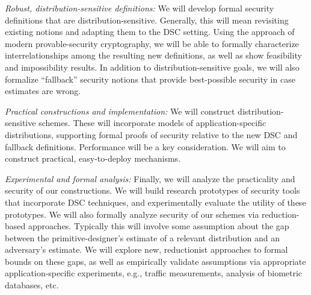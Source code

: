 {\begin{newenum}
\item{\em Robust, distribution-sensitive definitions:} 
We will develop formal security definitions that are
distribution-sensitive. Generally, this will mean revisiting existing notions
and adapting them to the DSC setting. Using the approach of modern 
provable-security cryptography, we will be able to formally characterize interrelationships among the resulting new
definitions, as well as show feasibility and impossibility results. 
In addition to distribution-sensitive goals, we will also formalize
``fallback'' security notions that provide best-possible security in case estimates are wrong.

\item{\em Practical constructions and implementation:}  
We will construct distribution-sensitive schemes. These will incorporate
models of application-specific distributions, supporting formal
proofs of security relative to the new DSC and fallback definitions. Performance will be a key consideration. We will
aim to construct practical, easy-to-deploy mechanisms.

\item{\em Experimental and formal analysis:} Finally, we will analyze the
practicality and security of our constructions. We will build
research prototypes of security tools that incorporate DSC techniques, and
experimentally evaluate the utility of these prototypes.  We will also formally analyze security of
our schemes via reduction-based approaches. Typically this will involve some
assumption about the gap between the primitive-designer's estimate of a
relevant distribution and an adversary's estimate. We will explore new,
reductionist approaches to formal bounds on these gaps, as well as
empirically validate assumptions via appropriate application-specific
experiments, e.g., traffic measurements, analysis of biometric databases, etc. 
\end{newenum}

}
